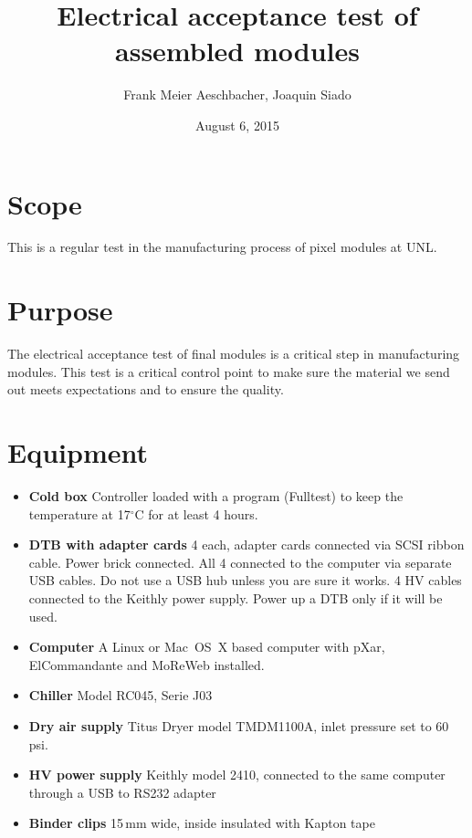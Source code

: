 \documentclass[12pt]{unlsilabsop}
\title{Electrical acceptance test of assembled modules}
\date{August 6, 2015}
\author{Frank Meier Aeschbacher, Joaquin Siado}
\begin{document}
\maketitle

\section{Scope}
This is a regular test in the manufacturing process of pixel modules at UNL.

\section{Purpose}
The electrical acceptance test of final modules is a critical step in manufacturing modules. This test is a critical control point to make sure the material we send out meets expectations and to ensure the quality.



\section{Equipment}

\begin{itemize}
\item \textbf{Cold box} Controller loaded with a program (Fulltest) to keep the temperature at 17$^\circ$C for at least 4 hours.
\item \textbf{DTB with adapter cards} 4 each, adapter cards connected via SCSI ribbon cable. Power brick connected. All 4 connected to the computer via separate USB cables. Do not use a USB hub unless you are sure it works. 4 HV cables connected to the Keithly power supply. Power up a DTB only if it will be used.
\item \textbf{Computer} A Linux or Mac~OS~X based computer with pXar, ElCommandante and MoReWeb installed.
\item \textbf{Chiller} Model RC045, Serie J03
\item \textbf{Dry air supply} Titus Dryer model TMDM1100A, inlet pressure set to 60\,psi.
\item \textbf{HV power supply} Keithly model 2410, connected to the same computer through a USB to RS232 adapter
\item \textbf{Binder clips} 15\,mm wide, inside insulated with Kapton tape
\end{itemize}
\end{document}
